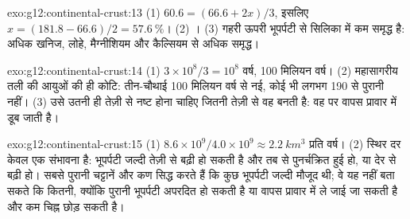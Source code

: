 \begin{solution}{exo:g12:continental-crust:13}
(1) $60.6 = (66.6 + 2x)/3$, इसलिए $x = (181.8 - 66.6)/2 = \qty{57.6}{\percent}$।
(2) । (3) गहरी  ऊपरी भूपर्पटी से सिलिका में कम
समृद्ध है: अधिक  खनिज, लोहे, मैग्नीशियम और कैल्सियम से अधिक समृद्ध।
\end{solution}

\begin{solution}{exo:g12:continental-crust:14}
(1) $3 \times 10^8/3 = 10^8$ वर्ष, 100 मिलियन वर्ष। (2) महासागरीय तली की
आयुओं की ही कोटि: तीन-चौथाई 100 मिलियन वर्ष से नई,
कोई भी लगभग 190 से पुरानी नहीं। (3) उसे उतनी ही तेज़ी से नष्ट होना चाहिए जितनी तेज़ी से वह बनती है:
वह  पर वापस प्रावार में डूब जाती है।
\end{solution}

\begin{solution}{exo:g12:continental-crust:15}
(1) $8.6 \times 10^9 / 4.0 \times 10^9 \approx \qty{2.2}{km^3}$ प्रति वर्ष।
(2) स्थिर दर केवल एक संभावना है: भूपर्पटी जल्दी तेज़ी से बढ़ी हो सकती है
और तब से पुनर्चक्रित हुई हो, या देर से बढ़ी हो। सबसे पुरानी चट्टानें और कण सिद्ध करते हैं
कि कुछ भूपर्पटी जल्दी मौजूद थी; वे यह नहीं बता सकते कि कितनी, क्योंकि पुरानी भूपर्पटी
अपरदित हो सकती है या वापस प्रावार में ले जाई जा सकती है और कम चिह्न छोड़ सकती है।
\end{solution}

